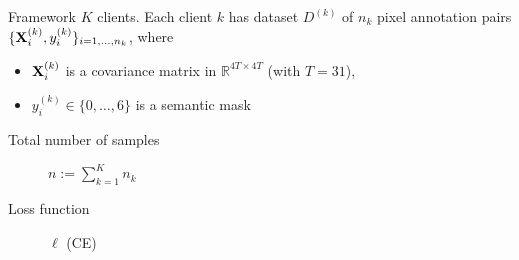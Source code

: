 \documentclass[aspectratio=169,xcolor=dvipsnames]{beamer}
\begin{document}
\begin{frame}{Framework}
$K$ clients. Each client $k$ has dataset $D^{(k)}$ of $n_k$ pixel annotation pairs $\{\bold{X}_{i}^{(k)},y_{i}^{(k)}\}_{i=1,\dots, n_k}$, where
\begin{itemize}
    \item $\bold{X}_{i}^{(k)}$ is a covariance matrix in $\mathbb{R}^{4T \times 4T}$ (with $T=31$),
    \item $y_i^{(k)}\in \{0,\dots, 6\}$ is a semantic mask
\end{itemize}

\begin{description}
\item[Total number of samples] $n:=\sum_{k=1}^{K}n_k$
\item[Loss function] $\ell$ (CE) 
\end{description}

\end{frame}
\end{document}
